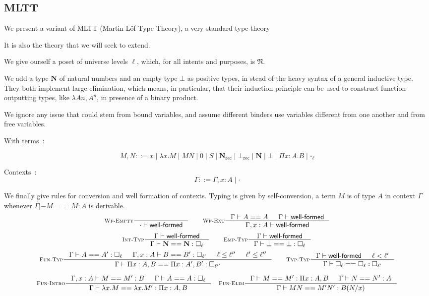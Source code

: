 \documentclass[11pt]{article}
\DeclareMathOperator{\rec}{rec}
\newcommand{\0}{\mathbf{0}}
\newcommand{\1}{\mathbf{1}}
\newcommand{\nat}{\mathbf{N}}
\newcommand{\mnat}{\mathfrak{N}}
\newcommand{\tctx}{\Gamma}
\newcommand{\Wf}{\textsf{well-formed}}
\begin{document}
\subsection{MLTT}
We present a variant of MLTT (Martin-Löf Type Theory), a very standard type theory

It is also the theory that we will seek to extend.

We give ourself a poset of universe levels $\ell$, which, for all intents and purposes, is $\mnat$.

We add a type $\nat$ of natural numbers and an empty type $\bot$ as positive types, in stead of the heavy syntax of a general inductive type. They both implement large elimination, which means, in particular, that their induction principle can be used to construct function outputting types, like $\lambda A n, A^n$, in presence of a binary product.

We ignore any issue that could stem from bound variables, and assume different binders use variables different from one another and from free variables.

With terms~:

$$ M,N ::= x \mid \lambda x. M \mid MN \mid 0 \mid S \mid \nat_{\rec} \mid \bot_{\rec} \mid \nat \mid \bot \mid \Pi x :A.B \mid \square_\ell $$


Contexts~:
$$ \tctx ::= \tctx, x : A \mid \cdot $$

We finally give rules for conversion and well formation of contexts. Typing is given by self-conversion, a term $M$ is of type $A$ in context $\Gamma$ whenever $\Gamma |- M == M : A$ is derivable.
$$
    \inference[\textsc{Wf-Empty}]{}{\cdot |- \Wf} \qquad
    \inference[\textsc{Wf-Ext}]{\tctx |- A == A & \tctx |- \Wf}{ \tctx, x : A |- \Wf}
$$
$$
    \inference[\textsc{Int-Typ}]{\tctx |- \Wf}{\tctx |- \nat == \nat : \square_\ell} \qquad
    \inference[\textsc{Emp-Typ}]{\tctx |- \Wf}{\tctx |- \bot == \bot : \square_\ell}
$$
$$
    \inference[\textsc{Fun-Typ}]{\tctx |- A == A' : \square_\ell & \tctx, x : A |- B == B' : \square_{\ell'} & \ell \leq \ell'' & \ell' \leq \ell''}{\tctx |- \Pi x  : A, B == \Pi x: A', B' : \square_{\ell''}} \qquad
    \inference[\textsc{Typ-Typ}]{\tctx |- \Wf & \ell < \ell' }{\tctx |- \square_\ell == \square_\ell: \square_{\ell'}}
$$


$$
    \inference[\textsc{Fun-Intro}]{\tctx, x : A |- M == M' : B &\tctx |- A == A : \square_\ell}{\tctx |- \lambda x. M == \lambda x. M' : \Pi x : A, B} \quad
    \inference[\textsc{Fun-Elim}]{\tctx |- M == M' : \Pi x:A, B& \tctx |- N == N' : A}{\tctx |- MN == M'N' : B(N/x)}
$$
\end{document}
